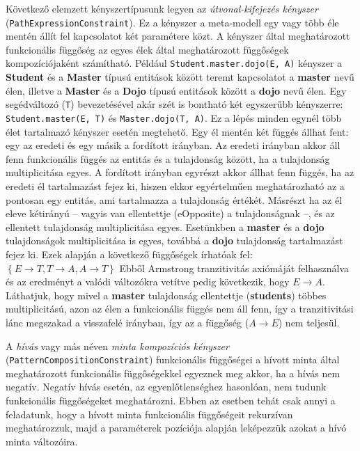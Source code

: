 \begin{sloppypar}
Következő elemzett kényszertípusunk legyen az \emph{útvonal-kifejezés kényszer} (\texttt{PathExpressionConstraint}).
Ez a kényszer a meta-modell egy vagy több éle mentén állít fel kapcsolatot két paramétere közt.
A kényszer által meghatározott funkcionális függőség az egyes élek által meghatározott függőségek kompozíciójaként számítható.
Például \texttt{Student.master.dojo(E, A)} kényszer a \textbf{Student} és a \textbf{Master} típusú entitások között teremt kapcsolatot a \textbf{master} nevű élen, illetve a \textbf{Master} és a \textbf{Dojo} típusú entitások között a \textbf{dojo} nevű élen.
Egy segédváltozó (\texttt{T}) bevezetésével akár szét is bontható két egyszerűbb kényszerre: \texttt{Student.master(E, T)} és \texttt{Master.dojo(T, A)}.
Ez a lépés minden egynél több élet tartalmazó kényszer esetén megtehető.
Egy él mentén két függés állhat fent: egy az eredeti és egy másik a fordított irányban.
Az eredeti irányban akkor áll fenn funkcionális függés az entitás és a tulajdonság között, ha a tulajdonság multiplicitása egyes.
A fordított irányban egyrészt akkor állhat fenn függés, ha az eredeti él tartalmazást fejez ki, hiszen ekkor egyértelműen meghatározható az a pontosan egy entitás, ami tartalmazza a tulajdonság értékét.
Másrészt ha az él eleve kétirányú -- vagyis van ellentettje (eOpposite) a tulajdonságnak --, és az ellentett tulajdonság multiplicitása egyes.
Esetünkben a \textbf{master} és a \textbf{dojo} tulajdonságok multiplicitása is egyes, továbbá a \textbf{dojo} tulajdonság tartalmazást fejez ki.
Ezek alapján a következő függőségek írhatóak fel: $\left\{ E \rightarrow T, T \rightarrow A, A \rightarrow T \right\}$
Ebből Armstrong tranzitivitás axiómáját felhasználva és az eredményt a valódi változókra vetítve pedig következik, hogy $E \rightarrow A$.
Láthatjuk, hogy mivel a \textbf{master} tulajdonság ellentettje (\textbf{students}) többes multiplicitású, azon az élen a funkcionális függés nem áll fenn, így a tranzitivitási lánc megszakad a visszafelé irányban, így az a függőség ($A \rightarrow E$) nem teljesül.
\end{sloppypar}

A \emph{hívás} vagy más néven \emph{minta kompozíciós kényszer} (\texttt{PatternCompositionConstraint}) funkcionális függőségei a hívott minta által meghatározott funkcionális függőségekkel egyeznek meg akkor, ha a hívás nem negatív.
Negatív hívás esetén, az egyenlőtlenséghez hasonlóan, nem tudunk funkcionális függőségeket meghatározni.
Ebben az esetben tehát csak annyi a feladatunk, hogy a hívott minta funkcionális függőségeit rekurzívan meghatározzuk, majd a paraméterek pozíciója alapján leképezzük azokat a hívó minta változóira.


